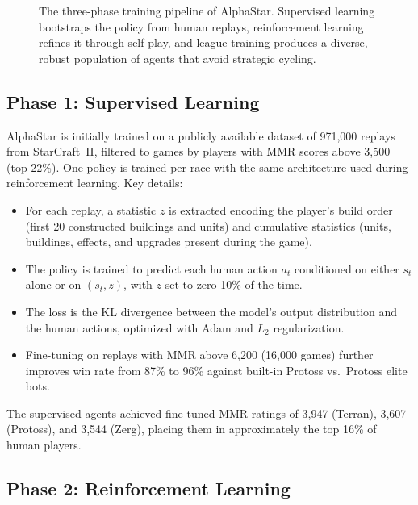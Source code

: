 \documentclass[11pt,a4paper]{article}
\begin{document}
\begin{figure}[H]
\caption{The three-phase training pipeline of AlphaStar. Supervised learning bootstraps the policy from human replays, reinforcement learning refines it through self-play, and league training produces a diverse, robust population of agents that avoid strategic cycling.}
\label{fig:training_pipeline}
\end{figure}

\subsection{Phase 1: Supervised Learning}

AlphaStar is initially trained on a publicly available dataset of 971,000 replays from StarCraft~II, filtered to games by players with MMR scores above 3,500 (top 22\%). One policy is trained per race with the same architecture used during reinforcement learning. Key details:

\begin{itemize}[nosep]
    \item For each replay, a statistic $z$ is extracted encoding the player's build order (first 20 constructed buildings and units) and cumulative statistics (units, buildings, effects, and upgrades present during the game).
    \item The policy is trained to predict each human action $a_t$ conditioned on either $s_t$ alone or on $(s_t, z)$, with $z$ set to zero 10\% of the time.
    \item The loss is the KL divergence between the model's output distribution and the human actions, optimized with Adam and $L_2$ regularization.
    \item Fine-tuning on replays with MMR above 6,200 (16,000 games) further improves win rate from 87\% to 96\% against built-in Protoss vs.\ Protoss elite bots.
\end{itemize}

The supervised agents achieved fine-tuned MMR ratings of 3,947 (Terran), 3,607 (Protoss), and 3,544 (Zerg), placing them in approximately the top 16\% of human players.

\subsection{Phase 2: Reinforcement Learning}
\end{document}
